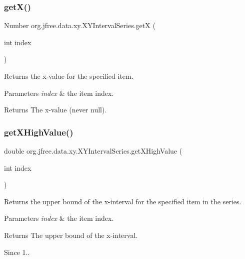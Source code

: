 \subsubsection{\texorpdfstring{get\+X()}{getX()}}
{\footnotesize\ttfamily Number org.\+jfree.\+data.\+xy.\+X\+Y\+Interval\+Series.\+getX (\begin{DoxyParamCaption}\item[{int}]{index }\end{DoxyParamCaption})}

Returns the x-\/value for the specified item.


\begin{DoxyParams}{Parameters}
{\em index} & the item index.\\
\hline
\end{DoxyParams}
\begin{DoxyReturn}{Returns}
The x-\/value (never {\ttfamily null}). 
\end{DoxyReturn}
\mbox{\label{classorg_1_1jfree_1_1data_1_1xy_1_1_x_y_interval_series_aac41d79c55d54ee58dfa8e74215d6e1e}} 
\subsubsection{\texorpdfstring{get\+X\+High\+Value()}{getXHighValue()}}
{\footnotesize\ttfamily double org.\+jfree.\+data.\+xy.\+X\+Y\+Interval\+Series.\+get\+X\+High\+Value (\begin{DoxyParamCaption}\item[{int}]{index }\end{DoxyParamCaption})}

Returns the upper bound of the x-\/interval for the specified item in the series.


\begin{DoxyParams}{Parameters}
{\em index} & the item index.\\
\hline
\end{DoxyParams}
\begin{DoxyReturn}{Returns}
The upper bound of the x-\/interval.
\end{DoxyReturn}
\begin{DoxySince}{Since}
1.. 
\end{DoxySince}
\mbox{\label{classorg_1_1jfree_1_1data_1_1xy_1_1_x_y_interval_series_af6db3fe496b93daf9975b76ad3e17edd}} 

